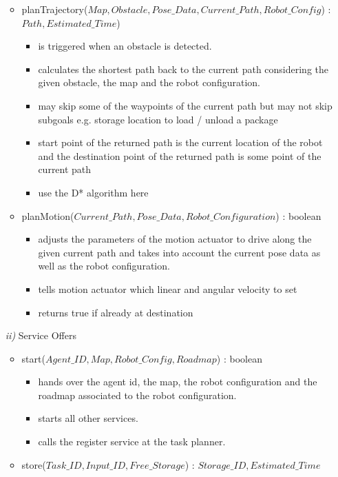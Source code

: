 \documentclass{article}
\begin{document}
\begin{enumerate}
\begin{itemize}
\begin{itemize}
		\end{itemize}
		\item planTrajectory($Map, Obstacle, Pose\_Data, Current\_Path, Robot\_Config$) : $Path, Estimated\_Time$)
		\begin{itemize}
			\item is triggered when an obstacle is detected. 
			\item calculates the shortest path back to the current path considering the given obstacle, the map and the robot configuration.
			\item may skip some of the waypoints of the current path but may not skip subgoals e.g. storage
location to load / unload a package
			\item start point of the returned path is the current location of the robot and the destination point of the returned path is some point of the current path
			\item use the D* algorithm here
		\end{itemize}
		\item planMotion($Current\_Path, Pose\_Data, Robot\_Configuration$) : boolean
		\begin{itemize}
			\item adjusts the parameters of the motion actuator to drive along the given current path and takes into account the current pose data as well as the robot configuration.
			\item tells motion actuator which linear and angular velocity to set
			\item returns true if already at destination
		\end{itemize}
	\end{itemize}
	\item[\textit{ii)}] Service Offers
	\begin{itemize}
		\item start($Agent\_ID, Map, Robot\_Config, Roadmap$) : boolean
		\begin{itemize}
			\item hands over the agent id, the map, the robot configuration and the roadmap associated to the robot configuration.
			\item starts all other services.
			\item calls the register service at the task planner.
		\end{itemize}
		\item store($Task\_ID, Input\_ID, Free\_Storage$) : $Storage\_ID, Estimated\_Time$
		\begin{itemize}

\end{itemize}
\end{itemize}
\end{enumerate}
\end{document}
